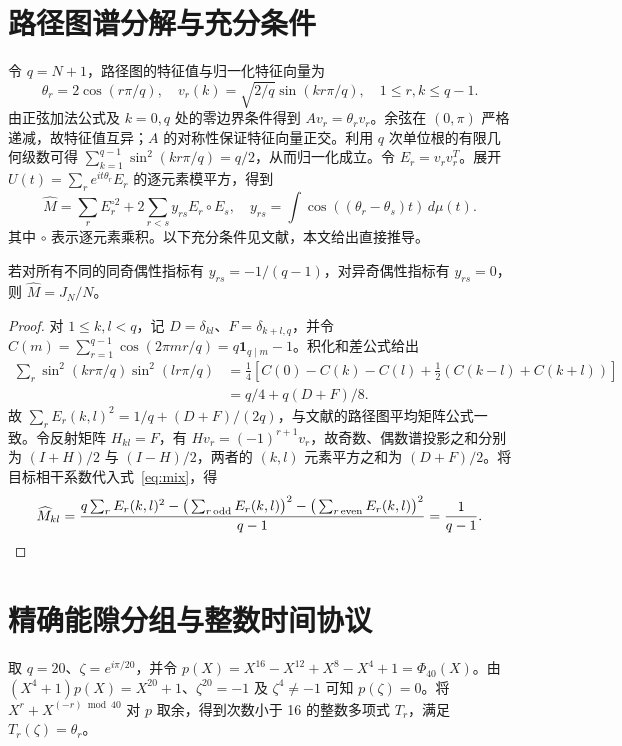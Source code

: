 \documentclass[11pt,a4paper]{article}
\begin{document}
\section{路径图谱分解与充分条件}
令 $q=N+1$，路径图的特征值与归一化特征向量为
\[
\theta_r=2\cos(r\pi/q),\quad v_r(k)=\sqrt{2/q}\sin(kr\pi/q),\quad 1\le r,k\le q-1.
\]
由正弦加法公式及 $k=0,q$ 处的零边界条件得到 $Av_r=\theta_rv_r$。余弦在 $(0,\pi)$ 严格递减，故特征值互异；$A$ 的对称性保证特征向量正交。利用 $q$ 次单位根的有限几何级数可得 $\sum_{k=1}^{q-1}\sin^2(kr\pi/q)=q/2$，从而归一化成立。令 $E_r=v_rv_r^T$。展开 $U(t)=\sum_r e^{it\theta_r}E_r$ 的逐元素模平方，得到
\begin{equation}\label{eq:mix}
\widehat M=\sum_r E_r^{\circ2}+2\sum_{r<s}y_{rs} E_r\circ E_s,\quad
 y_{rs}=\int\cos((\theta_r-\theta_s)t)\,d\mu(t).
\end{equation}
其中 $\circ$ 表示逐元素乘积。以下充分条件见文献\cite{kang}，本文给出直接推导。
\begin{lemma}\label{lem:target}
若对所有不同的同奇偶性指标有 $y_{rs}=-1/(q-1)$，对异奇偶性指标有 $y_{rs}=0$，则 $\widehat M=J_N/N$。
\end{lemma}
\begin{proof}
对 $1\le k,l<q$，记 $D=\delta_{kl}$、$F=\delta_{k+l,q}$，并令 $C(m)=\sum_{r=1}^{q-1}\cos(2\pi mr/q)=q\mathbf1_{q\mid m}-1$。积化和差公式给出
\begin{align*}
\sum_r\sin^2(kr\pi/q)\sin^2(lr\pi/q)
&=\tfrac14[C(0)-C(k)-C(l)+\tfrac12(C(k-l)+C(k+l))]\\
&=q/4+q(D+F)/8.
\end{align*}
故 $\sum_r E_r(k,l)^2=1/q+(D+F)/(2q)$，与文献\cite{godsil}的路径图平均矩阵公式一致。令反射矩阵 $H_{kl}=F$，有 $Hv_r=(-1)^{r+1}v_r$，故奇数、偶数谱投影之和分别为 $(I+H)/2$ 与 $(I-H)/2$，两者的 $(k,l)$ 元素平方之和为 $(D+F)/2$。将目标相干系数代入式~\eqref{eq:mix}，得
\[
\widehat M_{kl}=\frac{q\sum_r E_r(k,l)^2-\big(\sum_{r\,\mathrm{odd}}E_r(k,l)\big)^2-\big(\sum_{r\,\mathrm{even}}E_r(k,l)\big)^2}{q-1}=\frac1{q-1}.\qedhere
\]
\end{proof}
\section{精确能隙分组与整数时间协议}
取 $q=20$、$\zeta=e^{i\pi/20}$，并令 $p(X)=X^{16}-X^{12}+X^8-X^4+1=\Phi_{40}(X)$。由 $(X^4+1)p(X)=X^{20}+1$、$\zeta^{20}=-1$ 及 $\zeta^4\ne-1$ 可知 $p(\zeta)=0$。将 $X^r+X^{(-r)\bmod40}$ 对 $p$ 取余，得到次数小于 16 的整数多项式 $T_r$，满足 $T_r(\zeta)=\theta_r$。
\end{document}
